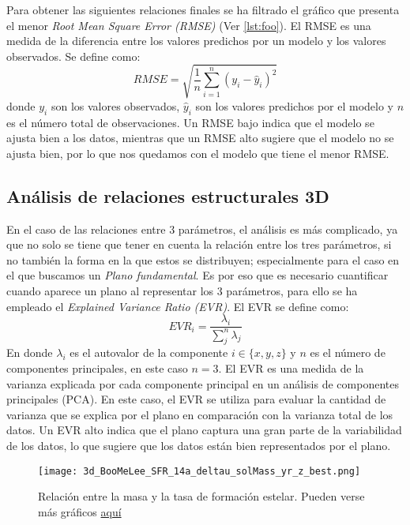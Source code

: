 \documentclass[11pt, a4paper]{article} %
\begin{document}
Para obtener las siguientes relaciones finales se ha filtrado el gráfico que presenta el menor \textit{Root Mean Square Error (RMSE)} (Ver \ref{lst:foo}). El RMSE es una medida de la diferencia entre los valores predichos por un modelo y los valores observados. Se define como:
\begin{equation}
    RMSE = \sqrt{\frac{1}{n}\sum_{i=1}^{n}(y_i - \hat{y}_i)^2}
\end{equation}
donde $y_i$ son los valores observados, $\hat{y}_i$ son los valores predichos por el modelo y $n$ es el número total de observaciones. Un RMSE bajo indica que el modelo se ajusta bien a los datos, mientras que un RMSE alto sugiere que el modelo no se ajusta bien, por lo que nos quedamos con el modelo que tiene el menor RMSE.

\subsection{Análisis de relaciones estructurales 3D}

En el caso de las relaciones entre 3 parámetros, el análisis es más complicado, ya que no solo se tiene que tener en cuenta la relación entre los tres parámetros, si no también la forma en la que estos se distribuyen; especialmente para el caso en el que buscamos un \textit{Plano fundamental}. 
Es por eso que es necesario cuantificar cuando aparece un plano al representar los 3 parámetros, para ello se ha empleado el \textit{Explained Variance Ratio (EVR)}. El EVR se define como:
\begin{equation}
    EVR_i=\frac{\lambda_i}{\sum_j^n\lambda_j}
\end{equation}
En donde $\lambda_i$ es el autovalor de la componente $i\in\{x,y,z\}$ y $n$ es el número de componentes principales, en este caso $n=3$.
El EVR es una medida de la varianza explicada por cada componente principal en un análisis de componentes principales (PCA). 
En este caso, el EVR se utiliza para evaluar la cantidad de varianza que se explica por el plano en comparación con la varianza total de los datos. Un EVR alto indica que el plano captura una gran parte de la variabilidad de los datos, lo que sugiere que los datos están bien representados por el plano.

\begin{figure}[H]
    \centering
    \texttt{[image: 3d\_BooMeLee\_SFR\_14a\_deltau\_solMass\_yr\_z\_best.png]}
    \caption{Relación entre la masa y la tasa de formación estelar. Pueden verse más gráficos \href{https://github.com/PhyAMR/TFG/tree/main/MSFR}{aquí}}
    \label{fig:3dexample}
\end{figure}
\end{document}
